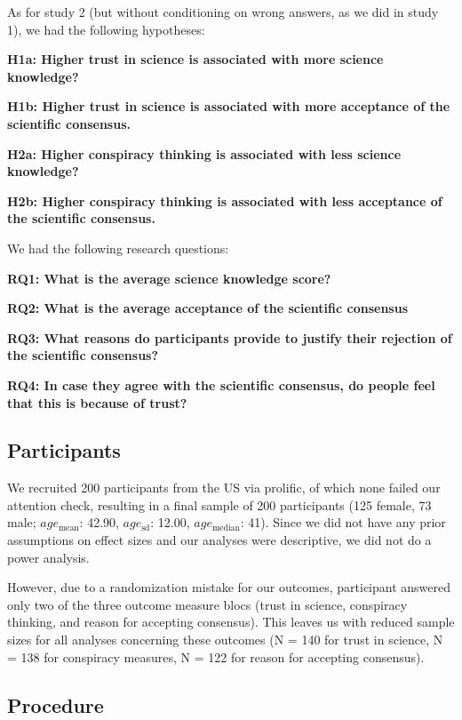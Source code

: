 \documentclass[
  doc,floatsintext]{apa6}
\begin{document}
As for study 2 (but without conditioning on wrong answers, as we did in study 1), we had the following hypotheses:

\textbf{H1a: Higher trust in science is associated with more science knowledge?}

\textbf{H1b: Higher trust in science is associated with more acceptance of the scientific consensus.}

\textbf{H2a: Higher conspiracy thinking is associated with less science knowledge?}

\textbf{H2b: Higher conspiracy thinking is associated with less acceptance of the scientific consensus.}

We had the following research questions:

\textbf{RQ1: What is the average science knowledge score?}

\textbf{RQ2: What is the average acceptance of the scientific consensus}

\textbf{RQ3: What reasons do participants provide to justify their rejection of the scientific consensus?}

\textbf{RQ4: In case they agree with the scientific consensus, do people feel that this is because of trust?}

\subsection{Participants}\label{participants-3}

We recruited 200 participants from the US via prolific, of which none failed our attention check, resulting in a final sample of 200 participants (125 female, 73 male; \(age_\text{mean}\): 42.90, \(age_\text{sd}\): 12.00, \(age_\text{median}\): 41). Since we did not have any prior assumptions on effect sizes and our analyses were descriptive, we did not do a power analysis.

However, due to a randomization mistake for our outcomes, participant answered only two of the three outcome measure blocs (trust in science, conspiracy thinking, and reason for accepting consensus). This leaves us with reduced sample sizes for all analyses concerning these outcomes (N = 140 for trust in science, N = 138 for conspiracy measures, N = 122 for reason for accepting consensus).

\subsection{Procedure}\label{procedure-2}
\end{document}
